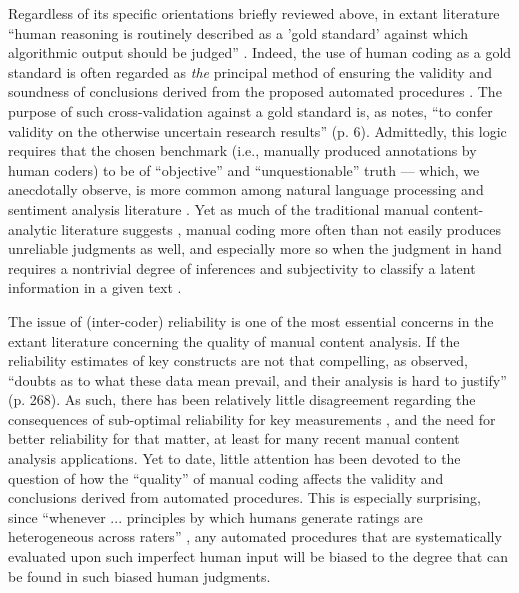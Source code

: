 \documentclass[man, 12pt, a4paper, nolmodern, noextraspace]{apa6}
\begin{document}
    Regardless of its specific orientations briefly reviewed above, in extant literature \enquote{human reasoning is routinely described as a 'gold standard' against which algorithmic output should be judged} \parencites[][p. 2]{dimaggio2015adapting}. Indeed, the use of human coding as a gold standard is often regarded as \textit{the} principal method of ensuring the validity and soundness of conclusions derived from the proposed automated procedures \parencites[e.g., ][]{grimmer2013text, lowe2013validating}. The purpose of such cross-validation against a gold standard is, as \textcite{Krippendorff2008validity} notes, \enquote{to confer validity on the otherwise uncertain research results} (p. 6). Admittedly, this logic requires that the chosen benchmark (i.e., manually produced annotations by human coders) to be of \enquote{objective} and \enquote{unquestionable} truth --- which, we anecdotally observe, is more common among natural language processing and sentiment analysis literature \parencites[e.g.,][]{dimaggio2015adapting}. Yet as much of the traditional manual content-analytic literature suggests \parencites[][]{krippendorff2004reliability, hayes2007answering, lombard2002content, ennser2018impact}, manual coding more often than not easily produces unreliable judgments as well, and especially more so when the judgment in hand requires a nontrivial degree of inferences and subjectivity to classify a latent information in a given text \parencites[][]{riff2014analyzing, Krippendorff2013}.       
    
    The issue of (inter-coder) reliability is one of the most essential concerns in the extant literature concerning the quality of manual content analysis. If the reliability estimates of key constructs are not that compelling, as \textcite{Krippendorff2013} observed, \enquote{doubts as to what these data mean prevail, and their analysis is hard to justify} (p. 268). As such, there has been relatively little disagreement regarding the consequences of sub-optimal reliability for key measurements \parencites[][]{krippendorff2004reliability, Krippendorff2013}, and the need for better reliability for that matter, at least for many recent manual content analysis applications. Yet to date, little attention has been devoted to the question of how the \enquote{quality} of manual coding affects the validity and conclusions derived from automated procedures. This is especially surprising, since \enquote{whenever ... principles by which humans generate ratings are heterogeneous across raters} \parencites[][p. 4]{dimaggio2015adapting}, any automated procedures that are systematically evaluated upon such imperfect human input will be biased to the degree that can be found in such biased human judgments. 
    
\end{document}

